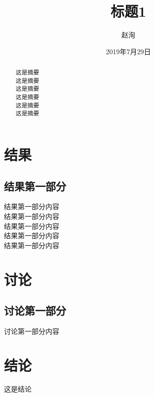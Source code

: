 \documentclass[UTF8]{ctexart}
\title{\bf{标题1}}
\author{赵洵}
\date{2019年7月29日}
\begin{document}
    \begin{titlepage}
        \maketitle
        \setcounter{page}{0}
        \thispagestyle{empty}
    \end{titlepage}

    \renewcommand{\abstractname}{摘要}
    \begin{abstract}
            这是摘要\\
            这是摘要\\
            这是摘要\\
            这是摘要\\
            这是摘要\\
            这是摘要
	\end{abstract}

	\section{结果}
		\subsection{结果第一部分}
            结果第一部分内容\\
            结果第一部分内容\\
            结果第一部分内容\\
            结果第一部分内容\\
            结果第一部分内容
	\section{讨论}
        \subsection{讨论第一部分}
            讨论第一部分内容
	\section{结论}
        这是结论
\end{document}
